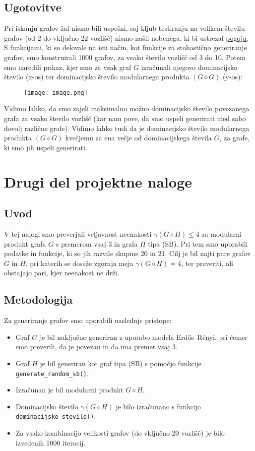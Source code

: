 \documentclass[a4paper,12pt]{article}
\theoremstyle{definition}
\begin{document}
\subsection{Ugotovitve}
Pri iskanju grafov žal nismo bili uspešni, saj kljub testiranju na velikem številu grafov (od 2 do vključno 22 vozlišč) nismo našli nobenega, ki bi ustrezal \hyperref[pogoj]{pogoju}. S funkcijami, ki so delovale na isti način, kot funkcije za stohastično generiranje grafov, smo konstruirali 1000 grafov, za vsako število vozlišč od 3 do 10. Potem smo naredili prikaz, kjer smo za vsak graf $G$ izračunali njegovo dominacijsko število (x-os) ter dominacijsko število modularnega produkta $(G \diamond G)$ (y-os):
\begin{figure}[h!]
    \centering
    \texttt{[image: image.png]}
\end{figure}

\noindent Vidimo lahko, da smo zajeli maksimalno možno dominacijsko število povezanega grafa za vsako število vozlišč (kar nam pove, da smo uspeli generirati med sabo dovolj različne grafe). Vidimo lahko tudi da je dominacijsko število modularnega produkta $(G \diamond G)$ kvečjemu za ena večje od dominacijskega števila $G$, za grafe, ki smo jih uspeli generirati.

\section{Drugi del projektne naloge}

\subsection{Uvod}
V tej nalogi smo preverjali veljavnost neenakosti $\gamma(G \diamond H) \leq 4$ za modularni produkt grafa $G$ s premerom vsaj 3 in grafa $H$ tipa (SB). Pri tem smo uporabili podatke in funkcije, ki so jih razvile skupine 20 in 21. Cilj je bil najti pare grafov $G$ in $H$, pri katerih se doseže zgornja meja $\gamma(G \diamond H) = 4$, ter preveriti, ali obstajajo pari, kjer neenakost ne drži.

\subsection{Metodologija}
Za generiranje grafov smo uporabili naslednje pristope:
\begin{itemize}
    \item Graf $G$ je bil naključno generiran z uporabo modela Erdős–Rényi, pri čemer smo preverili, da je povezan in da ima premer vsaj 3.
    \item Graf $H$ je bil generiran kot graf tipa (SB) s pomočjo funkcije \texttt{generate\_random\_sb()}.
    \item Izračunan je bil modularni produkt $G \diamond H$.
    \item Dominacijsko število $\gamma(G \diamond H)$ je bilo izračunano s funkcijo \texttt{dominacijsko\_stevilo()}.
    \item Za vsako kombinacijo velikosti grafov (do vključno 20 vozlišč) je bilo izvedenih 1000 iteracij.
\end{itemize}
\end{document}
